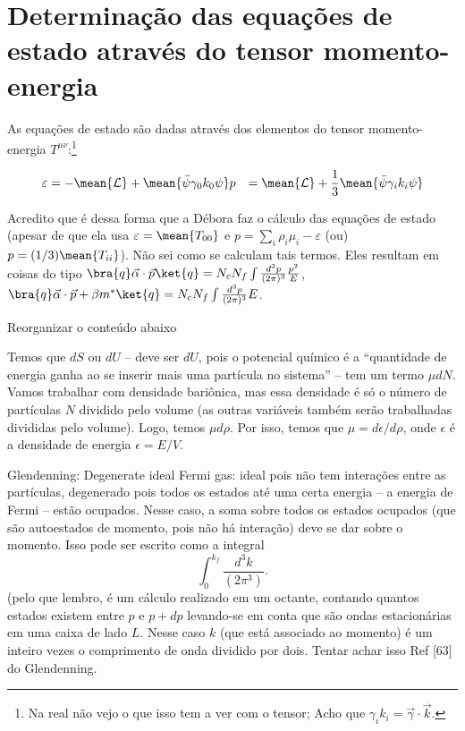 \section{Determinação das equações de estado através do tensor momento-energia}

As equações de estado são dadas através dos elementos do tensor momento-energia $T^{\mu\nu}$:\cite{Glendenning, Glendenning1983}\footnote{Na real não vejo o que isso tem a ver com o tensor; Acho que $\gamma_ik_i = \vec{\gamma}\cdot\vec{k}$.}

\begin{align}
	\varepsilon &= -\mean{\mathcal{L}} + \mean{\bar\psi\gamma_0k_0\psi}
	p &= \mean{\mathcal{L}} + \frac{1}{3} \mean{\bar\psi\gamma_ik_i\psi}
\end{align}

Acredito que é dessa forma que a Débora faz o cálculo das equações de estado (apesar de que ela usa $\varepsilon = \mean{T_{00}}$ e $p = \sum_i \rho_i \mu_i - \varepsilon$ (ou) $p = (1/3) \mean{T_{ii}}$). Não sei como se calculam tais termos. Eles resultam em coisas do tipo $\bra{q}\vec{\alpha}\cdot\vec{p}\ket{q} = N_c N_f \int \frac{d^3p}{(2\pi)^3}\frac{p^2}{E}$, $\bra{q}\vec{\alpha}\cdot\vec{p} + \beta m^*\ket{q} = N_c N_f \int \frac{d^3p}{(2\pi)^3}E$.



Reorganizar o conteúdo abaixo

Temos que $dS$ ou $dU$ -- deve ser $dU$, pois o potencial químico é a ``quantidade de energia ganha ao se inserir mais uma partícula no sistema'' -- tem um termo $\mu dN$. Vamos trabalhar com densidade bariônica, mas essa densidade é só o número de partículas $N$ dividido pelo volume (as outras variáveis também serão trabalhadas divididas pelo volume). Logo, temos $\mu d\rho$. Por isso, temos que $\mu = d\epsilon/d\rho$, onde $\epsilon$ é a densidade de energia $\epsilon = E/V$. 

Glendenning\cite{Glendenning}:
Degenerate ideal Fermi gas: ideal pois não tem interações entre as partículas, degenerado pois todos os estados até uma certa energia -- a energia de Fermi -- estão ocupados. Nesse caso, a soma sobre todos os estados ocupados (que são autoestados de momento, pois não há interação) deve se dar sobre o momento. Isso pode ser escrito como a integral
\begin{equation}
	\int_0^{k_f} \frac{d^3k}{(2\pi^3)}.
\end{equation}
%
(pelo que lembro, é um cálculo realizado em um octante, contando quantos estados existem entre $p$ e $p+dp$ levando-se em conta que são ondas estacionárias em uma caixa de lado $L$. Nesse caso $k$ (que está associado ao momento) é um inteiro vezes o comprimento de onda dividido por dois. Tentar achar isso Ref [63] do Glendenning.

